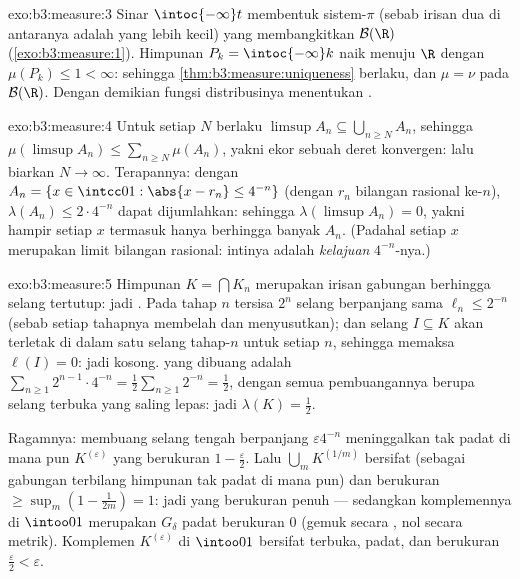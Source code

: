 \begin{solution}{exo:b3:measure:3}
Sinar $\intoc{-\infty}t$ membentuk sistem-$\pi$ (sebab
irisan dua di antaranya adalah yang lebih kecil) yang membangkitkan $\mathcal B(\R)$
(\cref{exo:b3:measure:1}). Himpunan $P_k = \intoc{-\infty}k$
naik menuju $\R$ dengan $\mu(P_k) \leq 1 < \infty$: sehingga
\cref{thm:b3:measure:uniqueness} berlaku, dan $\mu = \nu$ pada
$\mathcal B(\R)$. Dengan demikian fungsi distribusinya menentukan
.
\end{solution}

\begin{solution}{exo:b3:measure:4}
Untuk setiap $N$ berlaku $\limsup A_n \subseteq \bigcup_{n \geq N}A_n$,
sehingga $\mu(\limsup A_n) \leq \sum_{n\geq N}\mu(A_n)$, yakni ekor
sebuah deret konvergen: lalu biarkan $N \to \infty$. Terapannya: dengan
$A_n = \{x \in \intcc01 : \abs{x - r_n} \leq 4^{-n}\}$
(dengan $r_n$ bilangan rasional ke-$n$), $\lambda(A_n) \leq 2\cdot4^{-n}$
dapat dijumlahkan: sehingga $\lambda(\limsup A_n) = 0$, yakni hampir setiap $x$
termasuk hanya berhingga banyak $A_n$. (Padahal setiap $x$ merupakan limit
bilangan rasional: intinya adalah \emph{kelajuan} $4^{-n}$-nya.)
\end{solution}

\begin{solution}{exo:b3:measure:5}
Himpunan $K = \bigcap K_n$ merupakan irisan gabungan berhingga selang
tertutup: jadi . Pada tahap $n$ tersisa $2^n$ selang
berpanjang sama $\ell_n \leq 2^{-n}$ (sebab setiap tahapnya membelah dan
menyusutkan); dan selang $I \subseteq K$ akan terletak di dalam satu
selang tahap-$n$ untuk setiap $n$, sehingga memaksa $\ell(I) = 0$: jadi 
kosong.  yang dibuang adalah $\sum_{n\geq1}2^{n-1}\cdot
4^{-n} = \frac12\sum_{n\geq1}2^{-n} = \frac12$, dengan semua pembuangannya
berupa selang terbuka yang saling lepas: jadi $\lambda(K) = \frac12$.

Ragamnya: membuang selang tengah berpanjang $\varepsilon
4^{-n}$ meninggalkan  tak padat di mana pun $K^{(\varepsilon)}$ yang
berukuran $1 - \frac\varepsilon2$. Lalu $\bigcup_m
K^{(1/m)}$ bersifat  (sebagai gabungan terbilang himpunan tak padat di mana pun)
dan berukuran $\geq \sup_m(1 - \frac1{2m}) = 1$: jadi  yang
berukuran penuh --- sedangkan komplemennya di $\intoo01$ merupakan $G_\delta$
padat berukuran $0$ (gemuk secara , nol secara
metrik). Komplemen $K^{(\varepsilon)}$ di $\intoo01$ bersifat
terbuka, padat, dan berukuran $\frac\varepsilon2 < \varepsilon$.
\end{solution}

